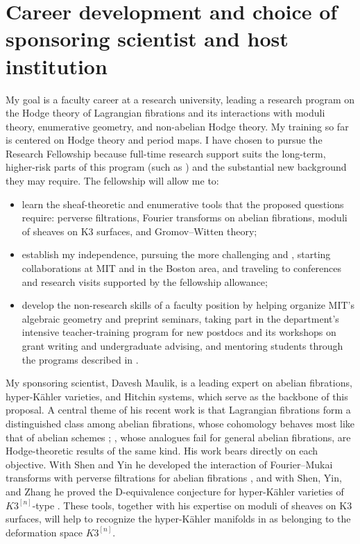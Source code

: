 \documentclass[11pt]{article}
\theoremstyle{compact}
\begin{document}
\section{Career development and choice of sponsoring scientist and host institution}

My goal is a faculty career at a research university, leading a research program on the
Hodge theory of Lagrangian fibrations and its interactions with moduli theory, enumerative
geometry, and non-abelian Hodge theory. My training so far is centered on Hodge theory and
period maps. I have chosen to pursue the  Research Fellowship because full-time research
support suits the long-term, higher-risk parts of this program (such as ) and the
substantial new background they may require. The fellowship will allow me to:
\begin{itemize}
\item learn the sheaf-theoretic and enumerative tools that the proposed questions require: 
perverse filtrations, Fourier transforms on abelian fibrations, moduli of sheaves on K3 surfaces, 
and Gromov--Witten theory; 
\item establish my independence, pursuing the more challenging  and 
, starting collaborations at MIT and in the Boston area, and traveling to 
conferences and research visits supported by the fellowship allowance;
\item develop the non-research skills of a faculty position by helping organize MIT's
algebraic geometry and preprint seminars, taking part in the department's intensive
teacher-training program for new postdocs and its workshops on grant writing and
undergraduate advising, and mentoring students through the programs described in
.
\end{itemize}

My sponsoring scientist, Davesh Maulik, is a leading expert on abelian fibrations, 
hyper-K\"ahler varieties, and Hitchin systems, which serve as the backbone of this proposal.
A central theme of his recent work is that Lagrangian fibrations form a distinguished class
among abelian fibrations, whose cohomology behaves most like that of abelian schemes
\cite{msy-fourier,msy-dualizable}; , whose analogues fail for
general abelian fibrations, are Hodge-theoretic results of the same kind.
His work bears directly on each objective. With Shen and Yin he developed the interaction of
Fourier--Mukai transforms with perverse filtrations for abelian fibrations
\cite{msy-fourier}, and with Shen, Yin, and Zhang he proved the D-equivalence conjecture for
hyper-K\"ahler varieties of $K3^{[n]}$-type \cite{msyz24}. These tools, together with his
expertise on moduli of sheaves on K3 surfaces, will help to recognize the
hyper-K\"ahler manifolds in  as belonging to the deformation space 
\(K3^{[n]}\). 
\end{document}
